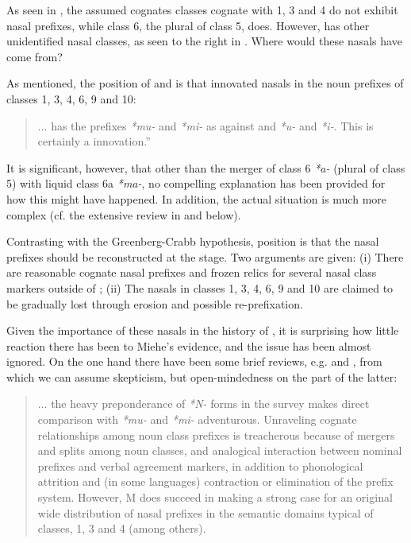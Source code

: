 \documentclass[output=paper]{langsci/langscibook}
\begin{document}
  
\noindent
As seen in , the assumed cognates classes cognate with  1, 3 and 4 do not exhibit nasal prefixes, while class 6, the plural of class 5, does. However,  has other unidentified nasal classes, as seen to the right in . Where would these nasals have come from?

As mentioned, the position of \citet{Greenberg1963} and \citet{Crabb1965} is that  innovated nasals in the noun prefixes of classes 1, 3, 4, 6, 9 and 10:

\begin{quote}
  ...  has the prefixes \textit{*mu-} and \textit{*mi-} as against  and  \textit{*u-} and \textit{*i-}. This is certainly a  innovation.” \citep[35]{Greenberg1963}
\end{quote}

It is significant, however, that other than the merger of class 6 \textit{*a-} (plural of class 5) with liquid class 6a \textit{*ma-}, no compelling explanation has been provided for how this might have happened. In addition, the actual situation is much more complex (cf. the extensive review in \citealt{Hyman1980nasalclasses} and below).

 
Contrasting with the Greenberg-Crabb hypothesis,    position is that the nasal prefixes should be reconstructed at the  stage. Two arguments are given: (i) There are reasonable cognate nasal prefixes and frozen relics for several nasal class markers outside of ; (ii) The nasals in classes 1, 3, 4, 6, 9 and 10 are claimed to be gradually lost through erosion and possible re-prefixation.

Given the importance of these nasals in the history of , it is surprising how little reaction there has been to Miehe’s evidence, and the issue has been almost ignored. On the one hand there have been some brief reviews, e.g. \citet{Hedinger1993} and \citet{Heath1994}, from which we can assume skepticism, but open-mindedness on the part of the latter:

\begin{quote}
... the heavy preponderance of \textit{*N-} forms in the survey makes direct comparison with  \textit{*mu-} and \textit{*mi-} adventurous. Unraveling cognate relationships among noun class prefixes is treacherous because of mergers and splits among noun classes, and analogical interaction between nominal prefixes and verbal agreement markers, in addition to phonological attrition and (in some languages) contraction or elimination of the prefix system. However, M does succeed in making a strong case for an original wide distribution of nasal prefixes in the semantic domains typical of  classes, 1, 3 and 4 (among others). \citep[863]{Heath1994}
\end{quote}
\end{document}

